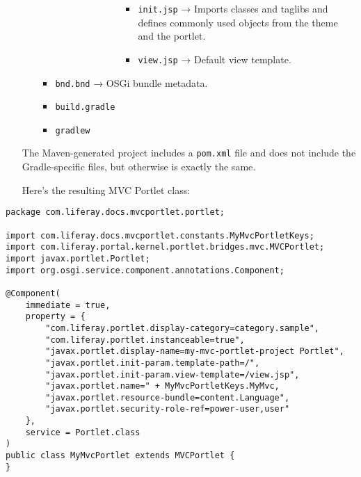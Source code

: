\begin{enumerate}
\begin{itemize}
\begin{itemize}
\begin{itemize}
\begin{itemize}
\begin{itemize}
\begin{itemize}
              \begin{itemize}
              \tightlist
              \item
                \texttt{init.jsp} → Imports classes and taglibs and
                defines commonly used objects from the theme and the
                portlet.
              \item
                \texttt{view.jsp} → Default view template.
              \end{itemize}
            \end{itemize}
          \end{itemize}
        \end{itemize}
      \end{itemize}
    \item
      \texttt{bnd.bnd} → OSGi bundle metadata.
    \item
      \texttt{build.gradle}
    \item
      \texttt{gradlew}
    \end{itemize}
  \end{itemize}

  The Maven-generated project includes a \texttt{pom.xml} file and does
  not include the Gradle-specific files, but otherwise is exactly the
  same.

  Here's the resulting MVC Portlet class:
\end{enumerate}

\begin{verbatim}
package com.liferay.docs.mvcportlet.portlet;

import com.liferay.docs.mvcportlet.constants.MyMvcPortletKeys;
import com.liferay.portal.kernel.portlet.bridges.mvc.MVCPortlet;
import javax.portlet.Portlet;
import org.osgi.service.component.annotations.Component;

@Component(
    immediate = true,
    property = {
        "com.liferay.portlet.display-category=category.sample",
        "com.liferay.portlet.instanceable=true",
        "javax.portlet.display-name=my-mvc-portlet-project Portlet",
        "javax.portlet.init-param.template-path=/",
        "javax.portlet.init-param.view-template=/view.jsp",
        "javax.portlet.name=" + MyMvcPortletKeys.MyMvc,
        "javax.portlet.resource-bundle=content.Language",
        "javax.portlet.security-role-ref=power-user,user"
    },
    service = Portlet.class
)
public class MyMvcPortlet extends MVCPortlet {
}
\end{verbatim}

